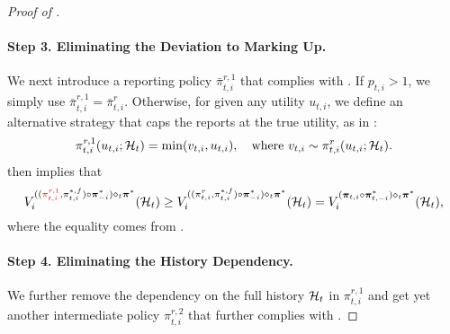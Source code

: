 \begin{proof}[Proof of ]
\paragraph{Step 3. Eliminating the Deviation to Marking Up.}
We next introduce a reporting policy $\bar\pi^{r,1}_{t,i}$ that complies with . If $p_{t,i}>1$, we simply use $\bar\pi^{r,1}_{t,i}=\bar\pi^{r}_{t,i}$. Otherwise, for given any utility $u_{t,i}$, we define an alternative strategy that caps the reports at the true utility, as in :
\begin{equation*}
\pi_{t,i}^{r,1}(u_{t,i};\mathcal{H}_t)=\min(v_{t,i},u_{t,i}),\quad \text{where }v_{t,i}\sim \pi_{t,i}^r (u_{t,i};\mathcal{H}_t).
\end{equation*}
 then implies that
\begin{equation}\label{eq:obj after removing marking up}
V_i^{(({\color{red}\pi_{t,i}^{r,1}},{\pi}_{t,i}^{\ast,f})\circ {\bm \pi}_{-i}^\ast)\diamond_t \bm \pi^\ast}(\mathcal{H}_t)  \geq V_i^{((\pi_{t,i}^{r},{\pi}_{t,i}^{\ast,f})\circ {\bm \pi}_{-i}^\ast)\diamond_t \bm \pi^\ast}(\mathcal{H}_t) = V_i^{(\bm \pi_{t,i}\circ \bm \pi_{t,-i}^\ast)\diamond_t \bm \pi^\ast}(\mathcal{H}_t), 
\end{equation}
where the equality comes from .

\paragraph{Step 4. Eliminating the History Dependency.}
We further remove the dependency on the full history $\mathcal{H}_t$ in $\pi_{t,i}^{r,1}$ and get yet another intermediate policy $\pi_{t,i}^{r,2}$ that further complies with .


\end{proof}
